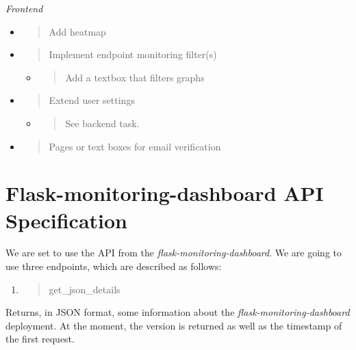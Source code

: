 \emph{Frontend}

\begin{itemize}
\item
  \begin{quote}
  Add heatmap
  \end{quote}
\item
  \begin{quote}
  Implement endpoint monitoring filter(s)
  \end{quote}

  \begin{itemize}
  \item
    \begin{quote}
    Add a textbox that filters graphs
    \end{quote}
  \end{itemize}
\item
  \begin{quote}
  Extend user settings
  \end{quote}

  \begin{itemize}
  \item
    \begin{quote}
    See backend task.
    \end{quote}
  \end{itemize}
\item
  \begin{quote}
  Pages or text boxes for email verification
  \end{quote}
\end{itemize}

\hypertarget{flask-monitoring-dashboard-api-specification}{%
\section{Flask-monitoring-dashboard API
Specification}\label{flask-monitoring-dashboard-api-specification}}

We are set to use the API from the \emph{flask-monitoring-dashboard}. We
are going to use three endpoints, which are described as follows:

\begin{enumerate}
\def\labelenumi{\arabic{enumi}.}
\item
  \begin{quote}
  get\_json\_details
  \end{quote}
\end{enumerate}

Returns, in JSON format, some information about the
\emph{flask-monitoring-dashboard} deployment. At the moment, the version
is returned as well as the timestamp of the first request.

